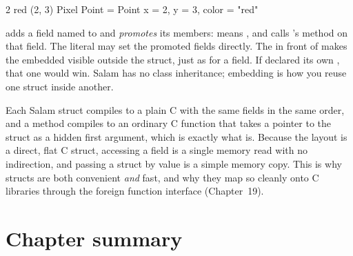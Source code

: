 \begin{progout}
2 red
(2, 3)
Pixel {Point = Point {x = 2, y = 3}, color = "red"}
\end{progout}

 adds a field named  to  and
\emph{promotes} its members:  means , and
 calls 's method on that field. The literal may
set the promoted fields directly. The  in front of  makes the
embedded  visible outside the struct, just as for a field. If
 declared its own , that one would win. Salam has no
class inheritance; embedding is how you reuse one struct inside another.

\begin{deep}
Each Salam struct compiles to a plain C  with the same fields in the
same order, and a method compiles to an ordinary C function that takes a pointer
to the struct as a hidden first argument, which is exactly what  is.
Because the layout is a direct, flat C struct, accessing a field is a single
memory read with no indirection, and passing a struct by value is a simple
memory copy. This is why structs are both convenient \emph{and} fast, and why
they map so cleanly onto C libraries through the foreign function interface
(Chapter~19).
\end{deep}

\section{Chapter summary}

